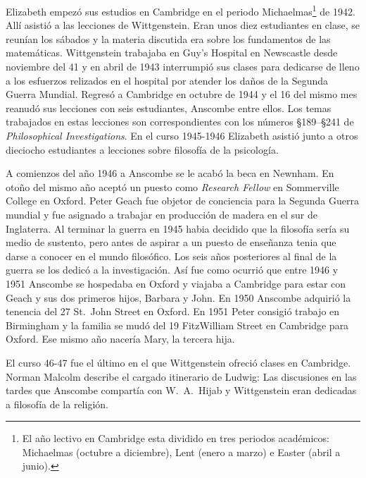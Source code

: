 Elizabeth empezó sus estudios en Cambridge en el periodo
Michaelmas\footnote{El año lectivo en Cambridge esta dividido en tres periodos
  académicos: Michaelmas (octubre a diciembre), Lent (enero a marzo) e Easter
  (abril a junio).} de 1942. Allí asistió a las lecciones de
Wittgenstein. Eran unos diez estudiantes en clase, se reunían los sábados y la
materia discutida era sobre los fundamentos de las matemáticas. Wittgenstein
trabajaba en Guy's Hospital en Newscastle desde noviembre del 41 y en abril de
1943 interrumpió sus clases para dedicarse de lleno a los esfuerzos relizados
en el hospital por atender los daños de la Segunda Guerra Mundial. Regresó a
Cambridge en octubre de 1944 y el 16 del mismo mes reanudó sus lecciones con
seis estudiantes, Anscombe entre ellos. Los temas trabajados en estas
lecciones son correspondientes con los números \S189--\S241 de \emph{Philosophical
Investigations}. En el curso 1945-1946 Elizabeth asistió junto a otros
dieciocho estudiantes a lecciones sobre filosofía de la
psicología.\autocite[cf.~][pp.~354-356]{pubnpriv}

A comienzos del año 1946 a Anscombe se le acabó la beca en Newnham. En otoño del
mismo año aceptó un puesto como \emph{Research Fellow} en Sommerville College en
Oxford. Peter Geach fue objetor de conciencia para la Segunda Guerra mundial y
fue asignado a trabajar en producción de madera en el sur de
Inglaterra.\autocite[cf.~][p.~34]{teichman2002fellows} Al terminar la guerra en
1945 habia decidido que la filosofía sería su medio de sustento, pero antes de
aspirar a un puesto de enseñanza tenia que darse a conocer en el mundo
filosófico.\autocite[cf.~][p.~12]{phiaut} Los seis años posteriores al final de
la guerra se los dedicó a la investigación. Así fue como ocurrió que entre 1946
y 1951 Anscombe se hospedaba en Oxford y viajaba a Cambridge para estar con
Geach y sus dos primeros hijos, Barbara y John. En 1950 Anscombe adquirió la
tenencia del 27 St.~John Street en Oxford. En 1951 Peter consigió trabajo en
Birmingham y la familia se mudó del 19 FitzWilliam Street en Cambridge para
Oxford.\autocite[cf.~][p.~208]{NWR} Ese mismo año nacería Mary, la tercera hija.

El curso 46-47 fue el último en el que Wittgenstein ofreció clases en Cambridge.
Norman Malcolm describe el cargado itinerario de Ludwig:
Las discusiones en las tardes que Anscombe compartía con W.~A.~Hijab y
Wittgenstein eran dedicadas a filosofía de la religión.


